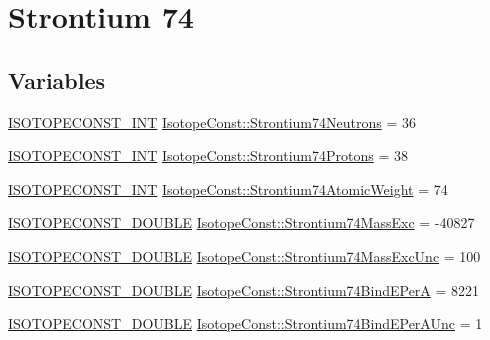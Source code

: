 \hypertarget{group___isotope_const-_strontium-_sr74}{}\section{Strontium 74}
\label{group___isotope_const-_strontium-_sr74}
\subsection*{Variables}
\begin{DoxyCompactItemize}
\item 
\mbox{\hyperlink{group___isotope_const-_macros_ga5f18360b3e99483a35c32d789e62621c}{I\+S\+O\+T\+O\+P\+E\+C\+O\+N\+S\+T\+\_\+\+I\+NT}} \mbox{\hyperlink{group___isotope_const-_strontium-_sr74_ga920c840f554ac2e2addc42ff64d87c98}{Isotope\+Const\+::\+Strontium74\+Neutrons}} = 36
\item 
\mbox{\hyperlink{group___isotope_const-_macros_ga5f18360b3e99483a35c32d789e62621c}{I\+S\+O\+T\+O\+P\+E\+C\+O\+N\+S\+T\+\_\+\+I\+NT}} \mbox{\hyperlink{group___isotope_const-_strontium-_sr74_gaf15496fc52e47fee8cc9006220ab3d6b}{Isotope\+Const\+::\+Strontium74\+Protons}} = 38
\item 
\mbox{\hyperlink{group___isotope_const-_macros_ga5f18360b3e99483a35c32d789e62621c}{I\+S\+O\+T\+O\+P\+E\+C\+O\+N\+S\+T\+\_\+\+I\+NT}} \mbox{\hyperlink{group___isotope_const-_strontium-_sr74_ga3021c7c208dcd28a430ae1bf9c5748f7}{Isotope\+Const\+::\+Strontium74\+Atomic\+Weight}} = 74
\item 
\mbox{\hyperlink{group___isotope_const-_macros_ga8f45a7272ce02c0b4c65c44636ed719a}{I\+S\+O\+T\+O\+P\+E\+C\+O\+N\+S\+T\+\_\+\+D\+O\+U\+B\+LE}} \mbox{\hyperlink{group___isotope_const-_strontium-_sr74_ga815052d520c2603a3f8d7b4da5f5d6f4}{Isotope\+Const\+::\+Strontium74\+Mass\+Exc}} = -\/40827
\item 
\mbox{\hyperlink{group___isotope_const-_macros_ga8f45a7272ce02c0b4c65c44636ed719a}{I\+S\+O\+T\+O\+P\+E\+C\+O\+N\+S\+T\+\_\+\+D\+O\+U\+B\+LE}} \mbox{\hyperlink{group___isotope_const-_strontium-_sr74_gabc54228d5fbd2603fac35c43a126a9a8}{Isotope\+Const\+::\+Strontium74\+Mass\+Exc\+Unc}} = 100
\item 
\mbox{\hyperlink{group___isotope_const-_macros_ga8f45a7272ce02c0b4c65c44636ed719a}{I\+S\+O\+T\+O\+P\+E\+C\+O\+N\+S\+T\+\_\+\+D\+O\+U\+B\+LE}} \mbox{\hyperlink{group___isotope_const-_strontium-_sr74_ga7500fd20df8cc9478ff56a2e40dde3fc}{Isotope\+Const\+::\+Strontium74\+Bind\+E\+PerA}} = 8221
\item 
\mbox{\hyperlink{group___isotope_const-_macros_ga8f45a7272ce02c0b4c65c44636ed719a}{I\+S\+O\+T\+O\+P\+E\+C\+O\+N\+S\+T\+\_\+\+D\+O\+U\+B\+LE}} \mbox{\hyperlink{group___isotope_const-_strontium-_sr74_ga6b148dc09d3c14af2a4853f53de1b40a}{Isotope\+Const\+::\+Strontium74\+Bind\+E\+Per\+A\+Unc}} = 1

\end{DoxyCompactItemize}
